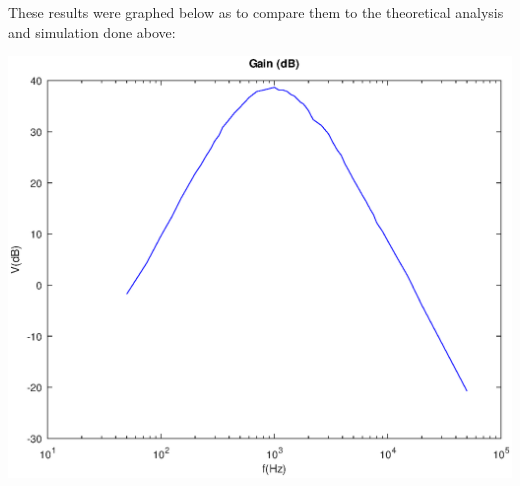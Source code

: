 \begin{table}
\begin{tabular}{|c|c|c|c|}
    \hline
    \end{tabular}
    \label{tab:fvl}
\end{table}

    These results were graphed below as to compare them to the theoretical analysis and simulation done above:

    \includegraphics[width=0.8\linewidth]{lab.eps}
